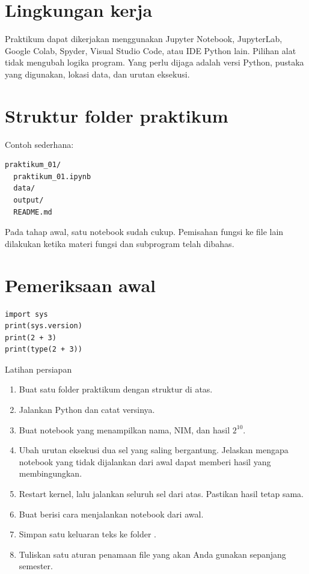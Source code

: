 \documentclass[11pt,a4paper]{report}
\newcommand{\kode}[1]{\texttt{\detokenize{#1}}}
\begin{document}
\section{Lingkungan kerja}
Praktikum dapat dikerjakan menggunakan Jupyter Notebook, JupyterLab, Google Colab, Spyder, Visual Studio Code, atau IDE Python lain. Pilihan alat tidak mengubah logika program. Yang perlu dijaga adalah versi Python, pustaka yang digunakan, lokasi data, dan urutan eksekusi.

\section{Struktur folder praktikum}
Contoh sederhana:
\begin{lstlisting}[language={}]
praktikum_01/
  praktikum_01.ipynb
  data/
  output/
  README.md
\end{lstlisting}
Pada tahap awal, satu notebook sudah cukup. Pemisahan fungsi ke file lain dilakukan ketika materi fungsi dan subprogram telah dibahas.

\section{Pemeriksaan awal}
\begin{lstlisting}
import sys
print(sys.version)
print(2 + 3)
print(type(2 + 3))
\end{lstlisting}

\begin{latihanbox}{Latihan persiapan}
\begin{enumerate}
  \item Buat satu folder praktikum dengan struktur di atas.
  \item Jalankan Python dan catat versinya.
  \item Buat notebook yang menampilkan nama, NIM, dan hasil $2^{10}$.
  \item Ubah urutan eksekusi dua sel yang saling bergantung. Jelaskan mengapa notebook yang tidak dijalankan dari awal dapat memberi hasil yang membingungkan.
  \item Restart kernel, lalu jalankan seluruh sel dari atas. Pastikan hasil tetap sama.
  \item Buat \kode{README.md} berisi cara menjalankan notebook dari awal.
  \item Simpan satu keluaran teks ke folder \kode{output/}.
  \item Tuliskan satu aturan penamaan file yang akan Anda gunakan sepanjang semester.
\end{enumerate}
\end{latihanbox}
\end{document}
